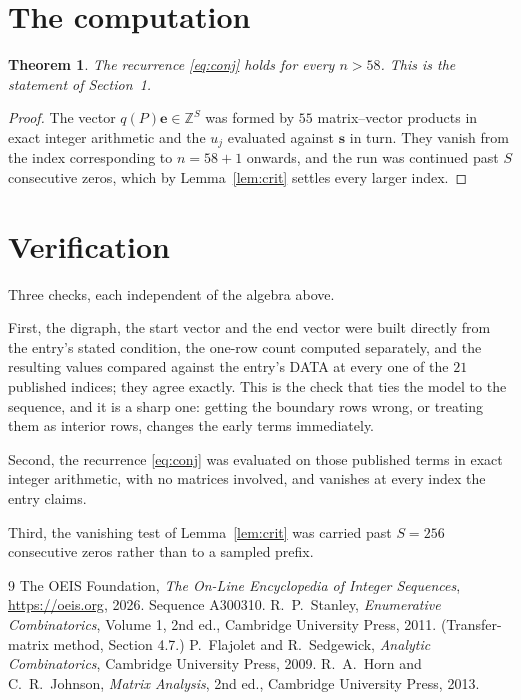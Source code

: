 \documentclass[11pt,a4paper]{article}
\theoremstyle{plain}
\newtheorem{theorem}{Theorem}
\theoremstyle{definition}
\begin{document}
\section{The computation}

\begin{theorem}
The recurrence \eqref{eq:conj} holds for every $n>58$. This is the statement of
Section~1.
\end{theorem}

\begin{proof}
The vector $q(P)\mathbf{e}\in\mathbb{Z}^{S}$ was formed by $55$ matrix--vector
products in exact integer arithmetic and the $u_j$ evaluated against $\mathbf{s}$ in turn.
They vanish from the index corresponding to $n=58+1$ onwards, and the run was continued
past $S$ consecutive zeros, which by Lemma~\ref{lem:crit} settles every larger index.
\end{proof}

\section{Verification}

Three checks, each independent of the algebra above.

First, the digraph, the start vector and the end vector were built directly from the
entry's stated condition, the one-row count computed separately, and the resulting values
compared against the entry's DATA at every one of the $21$ published indices; they
agree exactly. This is the check that ties the model to the sequence, and it is a sharp one:
getting the boundary rows wrong, or treating them as interior rows, changes the early terms
immediately.

Second, the recurrence \eqref{eq:conj} was evaluated on those published terms in exact
integer arithmetic, with no matrices involved, and vanishes at every index the entry claims.

Third, the vanishing test of Lemma~\ref{lem:crit} was carried past $S=256$ consecutive
zeros rather than to a sampled prefix.

\begin{thebibliography}{9}
 The OEIS Foundation, \emph{The On-Line Encyclopedia of Integer
Sequences}, \url{https://oeis.org}, 2026. Sequence A300310.
 R.~P.~Stanley, \emph{Enumerative Combinatorics}, Volume 1, 2nd ed.,
Cambridge University Press, 2011. (Transfer-matrix method, Section 4.7.)
 P.~Flajolet and R.~Sedgewick, \emph{Analytic Combinatorics}, Cambridge
University Press, 2009.
 R.~A.~Horn and C.~R.~Johnson, \emph{Matrix Analysis}, 2nd ed., Cambridge
University Press, 2013.
\end{thebibliography}
\end{document}
